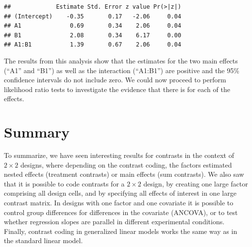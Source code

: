 \documentclass[12pt,]{krantz}
\newenvironment{Shaded}{\begin{snugshade}}{\end{snugshade}}
\newcommand{\CommentTok}[1]{\textcolor[rgb]{0.56,0.35,0.01}{\textit{#1}}}
\newcommand{\DataTypeTok}[1]{\textcolor[rgb]{0.13,0.29,0.53}{#1}}
\newcommand{\DecValTok}[1]{\textcolor[rgb]{0.00,0.00,0.81}{#1}}
\newcommand{\FloatTok}[1]{\textcolor[rgb]{0.00,0.00,0.81}{#1}}
\newcommand{\KeywordTok}[1]{\textcolor[rgb]{0.13,0.29,0.53}{\textbf{#1}}}
\newcommand{\NormalTok}[1]{#1}
\newcommand{\OperatorTok}[1]{\textcolor[rgb]{0.81,0.36,0.00}{\textbf{#1}}}
\newcommand{\StringTok}[1]{\textcolor[rgb]{0.31,0.60,0.02}{#1}}
\begin{document}
\begin{Shaded}
\end{Shaded}

\begin{Shaded}
\end{Shaded}

\begin{verbatim}
##             Estimate Std. Error z value Pr(>|z|)
## (Intercept)    -0.35       0.17   -2.06     0.04
## A1              0.69       0.34    2.06     0.04
## B1              2.08       0.34    6.17     0.00
## A1:B1           1.39       0.67    2.06     0.04
\end{verbatim}

The results from this analysis show that the estimates for the two main effects (``A1'' and ``B1'') as well as the interaction (``A1:B1'') are positive and the 95\% confidence intervals do not include zero. We could now proceed to perform likelihood ratio tests to investigate the evidence that there is for each of the effects.

\hypertarget{summary-2}{%
\section{Summary}\label{summary-2}}

To summarize, we have seen interesting results for contrasts in the context of \(2 \times 2\) designs, where depending on the contrast coding, the factors estimated nested effects (treatment contrasts) or main effects (sum contrasts). We also saw that it is possible to code contrasts for a \(2 \times 2\) design, by creating one large factor comprising all design cells, and by specifying all effects of interest in one large contrast matrix. In designs with one factor and one covariate it is possible to control group differences for differences in the covariate (ANCOVA), or to test whether regression slopes are parallel in different experimental conditions. Finally, contrast coding in generalized linear models works the same way as in the standard linear model.
\end{document}
